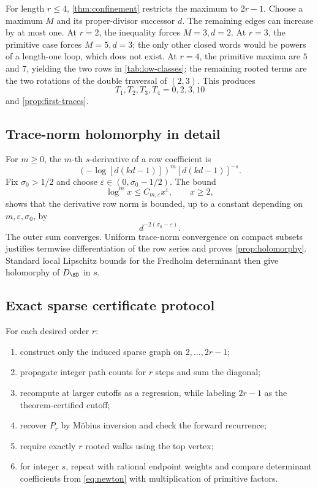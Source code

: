 For length \(r\le4\), \cref{thm:confinement} restricts the maximum to
\(2r-1\).  Choose a maximum \(M\) and its proper-divisor successor \(d\).
The remaining edges can increase by at most one.  At \(r=2\), the inequality
forces \(M=3,d=2\).  At \(r=3\), the primitive case forces
\(M=5,d=3\); the only other closed words would be powers of a length-one
loop, which does not exist.  At \(r=4\), the primitive maxima are \(5\) and
\(7\), yielding the two rows in \cref{tab:low-classes}; the remaining rooted
terms are the two rotations of the double traversal of \((2,3)\).  This
produces
\[
 T_1,T_2,T_3,T_4=0,2,3,10
\]
and \cref{prop:first-traces}.

\subsection{Trace-norm holomorphy in detail}

For \(m\ge0\), the \(m\)-th \(s\)-derivative of a row coefficient is
\[
 (-\log[d(kd-1)])^m[d(kd-1)]^{-s}.
\]
Fix \(\sigma_0>1/2\) and choose
\(\varepsilon\in(0,\sigma_0-1/2)\).  The bound
\[
 \log^m x\le C_{m,\varepsilon}x^\varepsilon,\qquad x\ge2,
\]
shows that the derivative row norm is bounded, up to a constant depending on
\(m,\varepsilon,\sigma_0\), by
\[
 d^{-2(\sigma_0-\varepsilon)}.
\]
The outer sum converges.  Uniform trace-norm convergence on compact subsets
justifies termwise differentiation of the row series and proves
\cref{prop:holomorphy}.  Standard local Lipschitz bounds for the Fredholm
determinant then give holomorphy of \(D_{\SD}\) in \(s\).

\subsection{Exact sparse certificate protocol}

For each desired order \(r\):

\begin{enumerate}
  \item construct only the induced sparse graph on
  \(2,\ldots,2r-1\);
  \item propagate integer path counts for \(r\) steps and sum the diagonal;
  \item recompute at larger cutoffs as a regression, while labeling
  \(2r-1\) as the theorem-certified cutoff;
  \item recover \(P_r\) by Möbius inversion and check the forward recurrence;
  \item require exactly \(r\) rooted walks using the top vertex;
  \item for integer \(s\), repeat with rational endpoint weights and compare
  determinant coefficients from \cref{eq:newton} with multiplication of
  primitive factors.
\end{enumerate}

